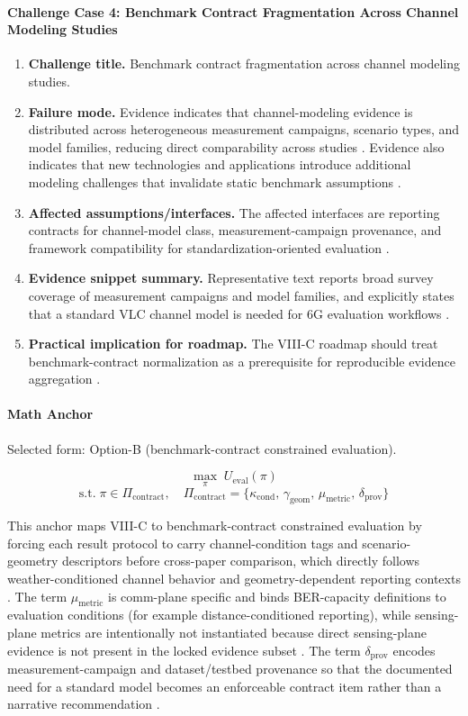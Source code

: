 \paragraph{Challenge Case 4: Benchmark Contract Fragmentation Across Channel Modeling Studies}
\begin{enumerate}
    \item \textbf{Challenge title.} Benchmark contract fragmentation across channel modeling studies.
    \item \textbf{Failure mode.} Evidence indicates that channel-modeling evidence is distributed across heterogeneous measurement campaigns, scenario types, and model families, reducing direct comparability across studies \cite{O_ISAC_327}. Evidence also indicates that new technologies and applications introduce additional modeling challenges that invalidate static benchmark assumptions \cite{O_ISAC_327}.
    \item \textbf{Affected assumptions/interfaces.} The affected interfaces are reporting contracts for channel-model class, measurement-campaign provenance, and framework compatibility for standardization-oriented evaluation \cite{O_ISAC_327}.
    \item \textbf{Evidence snippet summary.} Representative text reports broad survey coverage of measurement campaigns and model families, and explicitly states that a standard VLC channel model is needed for 6G evaluation workflows \cite{O_ISAC_327}.
    \item \textbf{Practical implication for roadmap.} The VIII-C roadmap should treat benchmark-contract normalization as a prerequisite for reproducible evidence aggregation \cite{O_ISAC_327}.
\end{enumerate}

\paragraph{Math Anchor}
Selected form: Option-B (benchmark-contract constrained evaluation).

\[
\max_{\pi}\; U_{\mathrm{eval}}(\pi)
\]
\[
\text{s.t.}\; \pi \in \Pi_{\mathrm{contract}},\quad
\Pi_{\mathrm{contract}} = \{\kappa_{\mathrm{cond}},\,\gamma_{\mathrm{geom}},\,\mu_{\mathrm{metric}},\,\delta_{\mathrm{prov}}\}
\]

This anchor maps VIII-C to benchmark-contract constrained evaluation by forcing each result protocol to carry channel-condition tags and scenario-geometry descriptors before cross-paper comparison, which directly follows weather-conditioned channel behavior and geometry-dependent reporting contexts \cite{O_ISAC_005, O_ISAC_327}. The term $\mu_{\mathrm{metric}}$ is comm-plane specific and binds BER-capacity definitions to evaluation conditions (for example distance-conditioned reporting), while sensing-plane metrics are intentionally not instantiated because direct sensing-plane evidence is not present in the locked evidence subset \cite{O_ISAC_381}. The term $\delta_{\mathrm{prov}}$ encodes measurement-campaign and dataset/testbed provenance so that the documented need for a standard model becomes an enforceable contract item rather than a narrative recommendation \cite{O_ISAC_327}.

